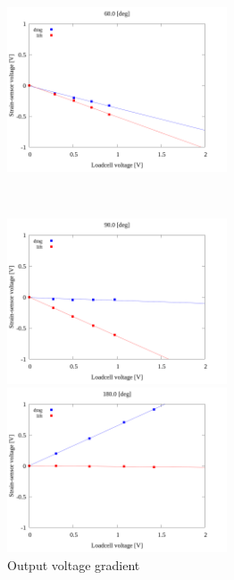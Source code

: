 \begin{figure}[htbp]
\begin{minipage}[b]{0.45\linewidth}
  \end{minipage}
  \begin{minipage}[b]{0.45\linewidth}
    \centering
    \includegraphics[width=65mm]{../../02_workspace/result/2-1/plot/04/04_linear_600.png}
  \end{minipage} \\
  \begin{minipage}[b]{0.45\linewidth}
    \centering
    \includegraphics[width=65mm]{../../02_workspace/result/2-1/plot/04/04_linear_900.png}
  \end{minipage}
  \begin{minipage}[b]{0.45\linewidth}
    \centering
    \includegraphics[width=65mm]{../../02_workspace/result/2-1/plot/04/04_linear_1800.png}
  \end{minipage}
  \caption{Output voltage gradient}
\end{figure}

